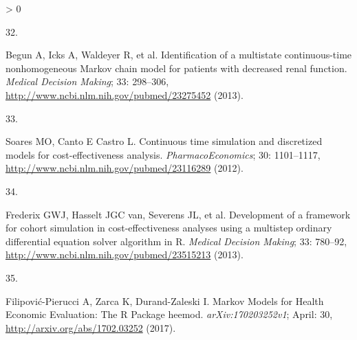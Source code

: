 \documentclass[
]{article}
\newlength{\cslhangindent}
\newlength{\csllabelwidth}
\newenvironment{CSLReferences}[2] %
 {%
  \setlength{\parindent}{0pt}
  \ifodd #1 \everypar{\setlength{\hangindent}{\cslhangindent}}\ignorespaces\fi
  \ifnum #2 > 0
  \setlength{\parskip}{#2\baselineskip}
  \fi
 }%
 {}
\newcommand{\CSLLeftMargin}[1]{\parbox[t]{\csllabelwidth}{#1}}
\newcommand{\CSLRightInline}[1]{\parbox[t]{\linewidth - \csllabelwidth}{#1}\break}
\begin{document}
\begin{CSLReferences}{0}{0}
\leavevmode\hypertarget{ref-Begun2013}{}%
\CSLLeftMargin{32. }
\CSLRightInline{Begun A, Icks A, Waldeyer R, et al. {Identification of a multistate continuous-time nonhomogeneous Markov chain model for patients with decreased renal function.} \emph{Medical Decision Making}; 33: 298--306, \url{http://www.ncbi.nlm.nih.gov/pubmed/23275452} (2013).}

\leavevmode\hypertarget{ref-Soares2012}{}%
\CSLLeftMargin{33. }
\CSLRightInline{Soares MO, Canto E Castro L. {Continuous time simulation and discretized models for cost-effectiveness analysis}. \emph{PharmacoEconomics}; 30: 1101--1117, \url{http://www.ncbi.nlm.nih.gov/pubmed/23116289} (2012).}

\leavevmode\hypertarget{ref-Frederix2013a}{}%
\CSLLeftMargin{34. }
\CSLRightInline{Frederix GWJ, Hasselt JGC van, Severens JL, et al. {Development of a framework for cohort simulation in cost-effectiveness analyses using a multistep ordinary differential equation solver algorithm in R.} \emph{Medical Decision Making}; 33: 780--92, \url{http://www.ncbi.nlm.nih.gov/pubmed/23515213} (2013).}

\leavevmode\hypertarget{ref-Filipovic-Pierucci2017}{}%
\CSLLeftMargin{35. }
\CSLRightInline{Filipović-Pierucci A, Zarca K, Durand-Zaleski I. {Markov Models for Health Economic Evaluation: The R Package heemod}. \emph{arXiv:170203252v1}; April: 30, \url{http://arxiv.org/abs/1702.03252} (2017).}

\end{CSLReferences}
\end{document}
